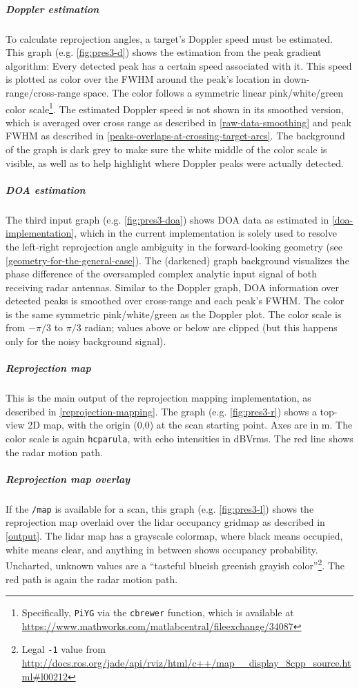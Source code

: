 \subparagraph{Doppler estimation}
To calculate reprojection angles, a target's Doppler speed must be estimated. This graph (e.g. \cref{fig:pres3-d}) shows the estimation from the peak gradient algorithm: Every detected peak has a certain speed associated with it. This speed is plotted as color over the FWHM around the peak's location in down-range/cross-range space. The color follows a symmetric linear pink/white/green color scale\footnote{Specifically, \texttt{PiYG} via the \texttt{cbrewer} function, which is available at \url{https://www.mathworks.com/matlabcentral/fileexchange/34087}}. The estimated Doppler speed is not shown in its smoothed version, which is averaged over cross range as described in \cref{raw-data-smoothing} and peak FWHM as described in \cref{peaks-overlaps-at-crossing-target-arcs}. The background of the graph is dark grey to make sure the white middle of the color scale is visible, as well as to help highlight where Doppler peaks were actually detected.

\subparagraph{DOA estimation}
The third input graph (e.g. \cref{fig:pres3-doa}) shows DOA data as estimated in \cref{doa-implementation}, which in the current implementation is solely used to resolve the left-right reprojection angle ambiguity in the forward-looking geometry (see \cref{geometry-for-the-general-case}). The (darkened) graph background visualizes the phase difference of the oversampled complex analytic input signal of both receiving radar antennas. Similar to the Doppler graph, DOA information over detected peaks is smoothed over cross-range and each peak's FWHM. The color is the same symmetric pink/white/green as the Doppler plot. The color scale is from $-\pi/3$ to $\pi/3$ radian; values above or below are clipped (but this happens only for the noisy background signal).

\subparagraph{Reprojection map}
This is the main output of the reprojection mapping implementation, as described in \cref{reprojection-mapping}. The graph (e.g. \cref{fig:pres3-r}) shows a top-view 2D map, with the origin (0,0) at the scan starting point. Axes are in \si{m}. The color scale is again \texttt{hcparula}, with echo intensities in \si{dBVrms}. The red line shows the radar motion path.

\subparagraph{Reprojection map overlay}
If the \texttt{/map} is available for a scan, this graph (e.g. \cref{fig:pres3-l}) shows the reprojection map overlaid over the lidar occupancy gridmap as described in \cref{output}. The lidar map has a grayscale colormap, where black means occupied, white means clear, and anything in between shows occupancy probability. Uncharted, unknown values are a ``tasteful blueish greenish grayish color''\footnote{Legal \texttt{-1} value from \url{http://docs.ros.org/jade/api/rviz/html/c++/map\_\_display\_8cpp\_source.html\#l00212}}. The red path is again the radar motion path.

